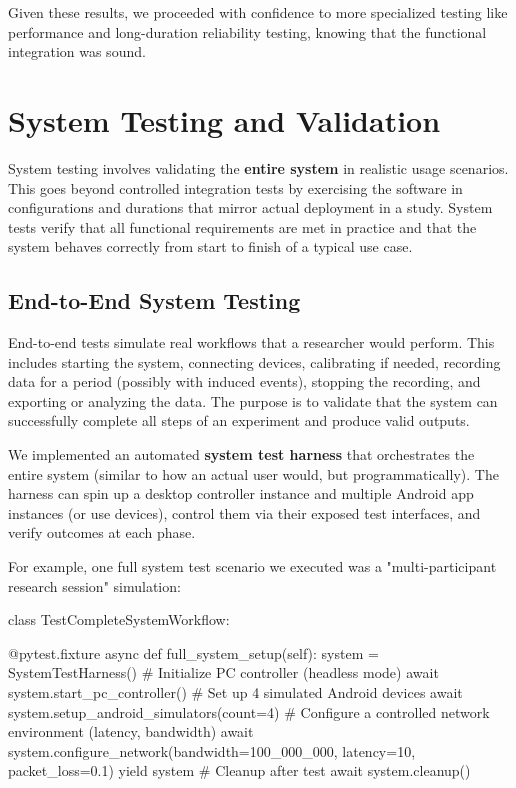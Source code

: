 \documentclass[11pt,a4paper]{report}
\begin{document}
Given these results, we proceeded with confidence to more specialized
testing like performance and long-duration reliability testing, knowing
that the functional integration was sound.

\section{System Testing and Validation}

System testing involves validating the \textbf{entire system} in realistic
usage scenarios. This goes beyond controlled integration tests by
exercising the software in configurations and durations that mirror
actual deployment in a study. System tests verify that all functional
requirements are met in practice and that the system behaves correctly
from start to finish of a typical use case.

\subsection{End-to-End System Testing}

End-to-end tests simulate real workflows that a researcher would
perform. This includes starting the system, connecting devices,
calibrating if needed, recording data for a period (possibly with
induced events), stopping the recording, and exporting or analyzing the
data. The purpose is to validate that the system can successfully
complete all steps of an experiment and produce valid outputs.

We implemented an automated \textbf{system test harness} that orchestrates
the entire system (similar to how an actual user would, but
programmatically). The harness can spin up a desktop controller instance
and multiple Android app instances (or use devices), control them via
their exposed test interfaces, and verify outcomes at each phase.

For example, one full system test scenario we executed was a
"multi-participant research session" simulation:

    class TestCompleteSystemWorkflow:

        @pytest.fixture
        async def full\_system\_setup(self):
            system = SystemTestHarness()
            # Initialize PC controller (headless mode)
            await system.start\_pc\_controller()
            # Set up 4 simulated Android devices
            await system.setup\_android\_simulators(count=4)
            # Configure a controlled network environment (latency, bandwidth)
            await system.configure\_network(bandwidth=100\_000\_000, latency=10, packet\_loss=0.1)
            yield system
            # Cleanup after test
            await system.cleanup()
\end{document}
